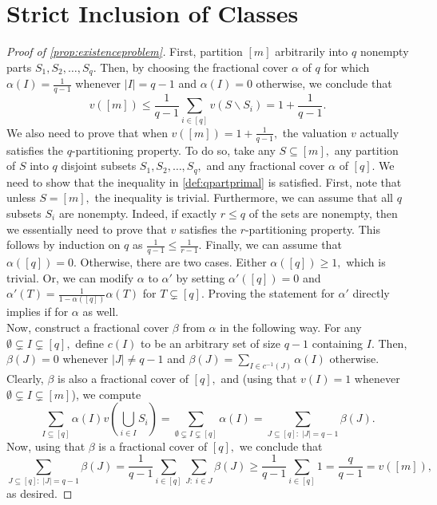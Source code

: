 \documentclass[11pt]{article}%
\numberwithin{theorem}{subsection}
\begin{document}
\printbibliography
\appendix

\section{Strict Inclusion of Classes}
\label{appendix:existenceproblem}
\begin{proof}[Proof of \cref{prop:existenceproblem}]
First, partition $[m]$ arbitrarily into $q$ nonempty parts  $S_1, S_2, \ldots, S_q.$ Then, by choosing the fractional cover $\alpha$ of $q$ for which $\alpha (I) = \frac{1}{q-1}$ whenever $|I| = q-1$ and $\alpha (I) = 0$ otherwise, we conclude that 
$$
v([m])\le \frac{1}{q-1}\sum_{i\in [q]}v(S\backslash S_i) = 1+ \frac{1}{q-1}.$$
We also need to prove that when $v([m]) = 1+ \frac{1}{q-1},$ the valuation $v$ actually satisfies the $q$-partitioning property. To do so, take any $S\subseteq [m],$ any partition of  $S$ into $q$ disjoint subsets $S_1, S_2, \ldots, S_q,$ and any fractional cover $\alpha$ of $[q].$ We need to show that the inequality in \cref{def:qpartprimal} is satisfied. First, note that unless $S = [m],$ the inequality is trivial. Furthermore, we can assume that all $q$ subsets $S_i$ are nonempty. Indeed, if exactly $r\le q$ of the sets are nonempty, then we essentially need to prove that $v$ satisfies the $r$-partitioning property. This follows by induction on $q$ as $\frac{1}{q-1}\le \frac{1}{r-1}.$ Finally, we can assume that $\alpha([q]) = 0.$ Otherwise, there are two cases. Either $\alpha([q]) \ge 1,$ which is trivial. Or,  we can modify $\alpha$ to $\alpha'$ by setting $\alpha'([q]) = 0$ and $\alpha'(T) = \frac{1}{1-\alpha([q])}\alpha(T)$ for $T\subsetneq [q].$ Proving the statement for $\alpha'$ directly implies if for $\alpha$ as well.
\\
Now, construct a fractional cover $\beta$ from $\alpha$ in the following way. For any $\emptyset\subsetneq I\subsetneq[q],$ define $c(I)$ to be an arbitrary set of size $q-1$ containing $I.$ Then, $\beta(J) = 0$ whenever $|J|\neq q-1$ and $\beta(J)  =\sum_{I \in c^{-1}(J)}\alpha(I)$ otherwise. Clearly, $\beta$ is also a fractional cover of $[q],$ and (using that $v(I) = 1$ whenever $\emptyset \subsetneq I \subsetneq [m]$), we compute
$$
\sum_{{I}\subseteq [q]} \alpha({I})v(\bigcup_{i \in {I}}S_i) = 
\sum_{\emptyset \subsetneq {I}\subsetneq [q]} \alpha({I}) = 
\sum_{J\subseteq [q] : \; |J| = q-1}\beta(J).
$$
Now, using that $\beta$ is a fractional cover of $[q],$ we conclude that 
$$
\sum_{J\subseteq [q] : \; |J| = q-1}\beta(J) = 
\frac{1}{q-1}\sum_{i \in [q]}\sum_{J :\; i \in J}\beta(J) \ge
\frac{1}{q-1}\sum_{i \in [q]}1 = \frac{q}{q-1} = v([m]),
$$
as desired.
\end{proof}
\end{document}
